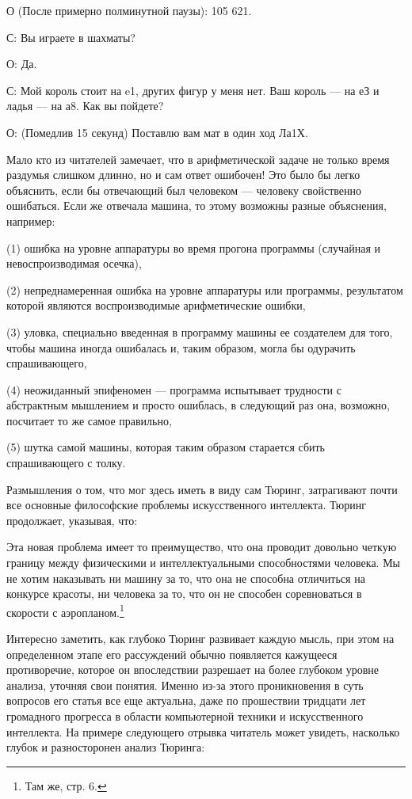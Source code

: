 О (После примерно полминутной паузы): 105 621.

С: Вы играете в шахматы?

О: Да.

С: Мой король стоит на e1, других фигур у меня нет. Ваш король --- на еЗ и ладья --- на а8. Как вы пойдете?

О: (Помедлив 15 секунд) Поставлю вам мат в один ход Ла1Х.

Мало кто из читателей замечает, что в арифметической задаче не только время раздумья слишком длинно, но и сам ответ ошибочен! Это было бы легко объяснить, если бы отвечающий был человеком --- человеку свойственно ошибаться. Если же отвечала машина, то этому возможны разные объяснения, например:

(1) ошибка на уровне аппаратуры во время прогона программы (случайная и невоспроизводимая осечка),

(2) непреднамеренная ошибка на уровне аппаратуры или программы, результатом которой являются воспроизводимые арифметические ошибки,

(3) уловка, специально введенная в программу машины ее создателем для того, чтобы машина иногда ошибалась и, таким образом, могла бы одурачить спрашивающего,

(4) неожиданный эпифеномен --- программа испытывает трудности с абстрактным мышлением и просто ошиблась, в следующий раз она, возможно, посчитает то же самое правильно,

(5) шутка самой машины, которая таким образом старается сбить спрашивающего с толку.

Размышления о том, что мог здесь иметь в виду сам Тюринг, затрагивают почти все основные философские проблемы искусственного интеллекта. Тюринг продолжает, указывая, что:

Эта новая проблема имеет то преимущество, что она проводит довольно четкую границу между физическими и интеллектуальными способностями человека. Мы не хотим наказывать ни машину за то, что она не способна отличиться на конкурсе красоты, ни человека за то, что он не способен соревноваться в скорости с аэропланом.\footnote{Там же, стр. 6.}

Интересно заметить, как глубоко Тюринг развивает каждую мысль, при этом на определенном этапе его рассуждений обычно появляется кажущееся противоречие, которое он впоследствии разрешает на более глубоком уровне анализа, уточняя свои понятия. Именно из-за этого проникновения в суть вопросов его статья все еще актуальна, даже по прошествии тридцати лет громадного прогресса в области компьютерной техники и искусственного интеллекта. На примере следующего отрывка читатель может увидеть, насколько глубок и разносторонен анализ Тюринга:

